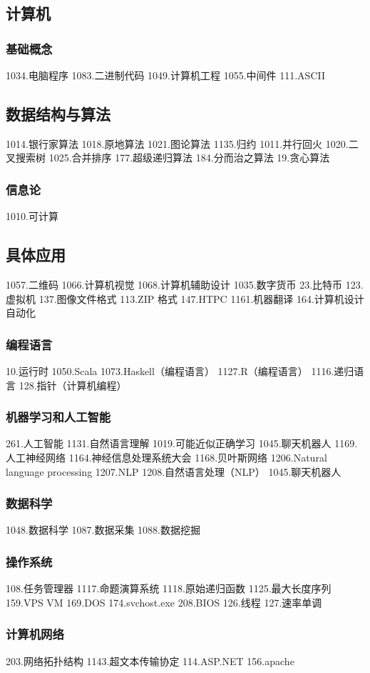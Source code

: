 \subsection{计算机}
\subsubsection{基础概念}
1034.电脑程序
1083.二进制代码
1049.计算机工程
1055.中间件
111.ASCII
\subsection{数据结构与算法}
1014.银行家算法
1018.原地算法
1021.图论算法
1135.归约
1011.并行回火
1020.二叉搜索树
1025.合并排序
177.超级递归算法
184.分而治之算法
19.贪心算法
\subsubsection{信息论}
1010.可计算
\subsection{具体应用}
1057.二维码
1066.计算机视觉
1068.计算机辅助设计
1035.数字货币
23.比特币
123.虚拟机
137.图像文件格式
113.ZIP 格式
147.HTPC
1161.机器翻译
164.计算机设计自动化
\subsubsection{编程语言}
10.运行时
1050.Scala
1073.Haskell（编程语言）
1127.R（编程语言）
1116.递归语言
128.指针（计算机编程）
\subsubsection{机器学习和人工智能}
261.人工智能
1131.自然语言理解
1019.可能近似正确学习
1045.聊天机器人
1169.人工神经网络
1164.神经信息处理系统大会
1168.贝叶斯网络
1206.Natural language processing
1207.NLP
1208.自然语言处理（NLP）
1045.聊天机器人
\subsubsection{数据科学}
1048.数据科学
1087.数据采集
1088.数据挖掘
\subsubsection{操作系统}
108.任务管理器
1117.命题演算系统
1118.原始递归函数
1125.最大长度序列
159.VPS VM
169.DOS
174.svchost.exe
208.BIOS
126.线程
127.速率单调
\subsubsection{计算机网络}
203.网络拓扑结构
1143.超文本传输协定
114.ASP.NET
156.apache

